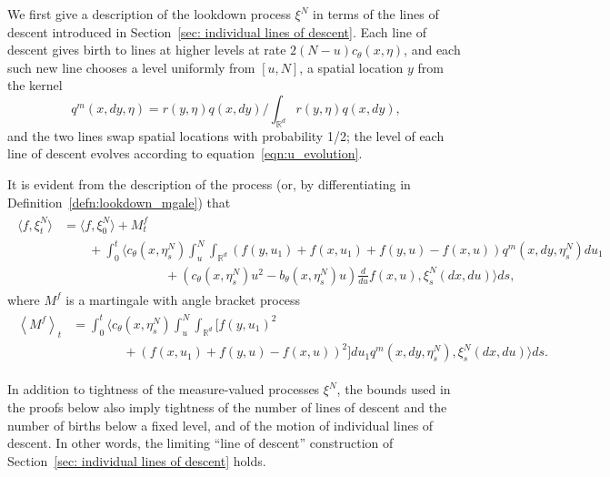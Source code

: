 \documentclass[EJP]{ejpecp} %
\newcommand{\IR}{\mathbb R}
\newcommand{\lp}{\xi}              %
\begin{document}
We first give a description of the lookdown process $\lp^N$ in terms of the lines of descent
introduced in Section~\ref{sec: individual lines of descent}.
Each line of descent
gives birth to lines at higher levels at rate $2 (N - u) c_\theta(x, \eta)$,
and each such new line chooses a level uniformly from $[u, N]$,
a spatial location $y$ from the kernel
\begin{equation} \label{eqn:qm_defn}
    q^m(x, dy, \eta)
    =
    r(y, \eta) q(x, dy) / \int_{\IR^d} r(y, \eta) q(x, dy),
\end{equation}
and the two lines swap spatial locations with probability 1/2;
the level of each line of descent evolves according to equation~\eqref{eqn:u_evolution}.

It is evident from the description of the process
(or, by differentiating in Definition~\ref{defn:lookdown_mgale})
that
\begin{align} \label{eqn:f_xi_mgale}
\begin{split}
    \langle f, \lp_t^N \rangle
    &=
    \langle f, \lp_0^N \rangle
    + M^f_t
\\ & \qquad {}
    +
    \int_0^t
    \bigg\langle
        c_\theta(x, \eta^N_s)
        \int_u^N \int_{\IR^d}
        \left(
            f(y, u_1) + f(x, u_1) + f(y, u) - f(x, u)
        \right)
        q^m(x, dy, \eta^N_s) du_1 
\\ & \qquad \qquad \qquad \qquad {}
        +
        \left(
            c_\theta(x, \eta^N_s) u^2
            - b_\theta(x, \eta^N_s) u
        \right)
        \frac{d}{du} f(x, u)
    ,
    \lp_s^N(dx, du) \bigg \rangle
    ds ,
\end{split}
\end{align}
where $M^f$ is a martingale
with angle bracket process
\begin{align} \label{eqn:f_xi_qv}
    \begin{split}
    \left\langle M^f \right\rangle_t
    &=
    \int_0^t
    \bigg \langle c_\theta(x, \eta_s^N) \int_u^N \int_{\IR^d}
        \big[ f(y, u_1)^2
\\&\qquad \qquad {}
        + \left( f(x, u_1) + f(y, u) - f(x, u) \right)^2 \big]
    du_1 q^m(x, dy, \eta^N_s)
    ,
    \lp_s^N(dx, du) \bigg \rangle
    ds .
\end{split}\end{align}

\begin{remark}
In addition to tightness of the measure-valued processes $\lp^N$, 
the bounds used in the proofs below also imply
tightness of the number of lines of descent and the number of births below a fixed level,
and of the motion of individual lines of descent.
In other words, the limiting ``line of descent'' construction
of Section~\ref{sec: individual lines of descent} holds.
\end{remark}
\end{document}
